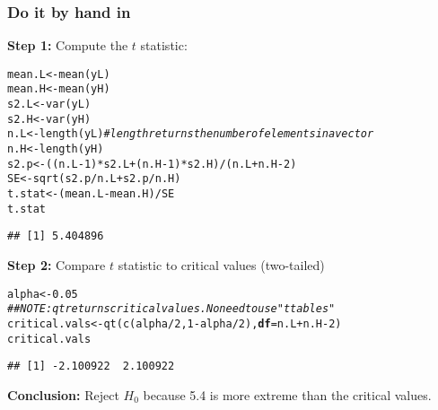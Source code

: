 \documentclass[color=usenames,dvipsnames]{beamer}\usepackage[]{graphicx}\usepackage[]{color}
\makeatletter
\newcommand{\hlnum}[1]{\textcolor[rgb]{0.69,0.494,0}{#1}}%
\newcommand{\hlcom}[1]{\textcolor[rgb]{0.514,0.506,0.514}{\textit{#1}}}%
\newcommand{\hlopt}[1]{\textcolor[rgb]{0,0,0}{#1}}%
\newcommand{\hlstd}[1]{\textcolor[rgb]{0,0,0}{#1}}%
\newcommand{\hlkwb}[1]{\textcolor[rgb]{0,0.341,0.682}{#1}}%
\newcommand{\hlkwc}[1]{\textcolor[rgb]{0,0,0}{\textbf{#1}}}%
\newcommand{\hlkwd}[1]{\textcolor[rgb]{0.004,0.004,0.506}{#1}}%
\newenvironment{kframe}{%
 \def\at@end@of@kframe{}%
 \ifinner\ifhmode%
  \def\at@end@of@kframe{\end{minipage}}%
  \begin{minipage}{\columnwidth}%
 \fi\fi%
 \def\FrameCommand##1{\hskip\@totalleftmargin \hskip-\fboxsep
 \colorbox{shadecolor}{##1}\hskip-\fboxsep
     \hskip-\linewidth \hskip-\@totalleftmargin \hskip\columnwidth}%
 \MakeFramed {\advance\hsize-\width
   \@totalleftmargin\z@ \linewidth\hsize
   \@setminipage}}%
 {\par\unskip\endMakeFramed%
 \at@end@of@kframe}
\newenvironment{knitrout}{}{} %
\makeatother
\begin{document}
\begin{frame}[fragile]
  \frametitle{Do it by hand in \R}
  {\bf Step 1:} Compute the $t$ statistic:
  \footnotesize
\begin{knitrout}\scriptsize
{}\color{fgcolor}\begin{kframe}
\begin{alltt}
\hlstd{mean.L} \hlkwb{<-} \hlkwd{mean}\hlstd{(yL)}
\hlstd{mean.H} \hlkwb{<-} \hlkwd{mean}\hlstd{(yH)}
\hlstd{s2.L} \hlkwb{<-} \hlkwd{var}\hlstd{(yL)}
\hlstd{s2.H} \hlkwb{<-} \hlkwd{var}\hlstd{(yH)}
\hlstd{n.L} \hlkwb{<-} \hlkwd{length}\hlstd{(yL)} \hlcom{# length returns the number of elements in a vector}
\hlstd{n.H} \hlkwb{<-} \hlkwd{length}\hlstd{(yH)}
\hlstd{s2.p} \hlkwb{<-} \hlstd{((n.L}\hlopt{-}\hlnum{1}\hlstd{)}\hlopt{*}\hlstd{s2.L} \hlopt{+} \hlstd{(n.H}\hlopt{-}\hlnum{1}\hlstd{)}\hlopt{*}\hlstd{s2.H)}\hlopt{/}\hlstd{(n.L}\hlopt{+}\hlstd{n.H}\hlopt{-}\hlnum{2}\hlstd{)}
\hlstd{SE} \hlkwb{<-} \hlkwd{sqrt}\hlstd{(s2.p}\hlopt{/}\hlstd{n.L} \hlopt{+} \hlstd{s2.p}\hlopt{/}\hlstd{n.H)}
\hlstd{t.stat} \hlkwb{<-} \hlstd{(mean.L} \hlopt{-} \hlstd{mean.H)} \hlopt{/} \hlstd{SE}
\hlstd{t.stat}
\end{alltt}
\begin{verbatim}
## [1] 5.404896
\end{verbatim}
\end{kframe}
\end{knitrout}
\pause
  {\bf Step 2:} Compare $t$ statistic to critical values (two-tailed)
  \footnotesize
\begin{knitrout}\tiny
{}\color{fgcolor}\begin{kframe}
\begin{alltt}
\hlstd{alpha} \hlkwb{<-} \hlnum{0.05}
\hlcom{## NOTE: qt returns critical values. No need to use "t tables"}
\hlstd{critical.vals} \hlkwb{<-} \hlkwd{qt}\hlstd{(}\hlkwd{c}\hlstd{(alpha}\hlopt{/}\hlnum{2}\hlstd{,} \hlnum{1}\hlopt{-}\hlstd{alpha}\hlopt{/}\hlnum{2}\hlstd{),} \hlkwc{df}\hlstd{=n.L}\hlopt{+}\hlstd{n.H}\hlopt{-}\hlnum{2}\hlstd{)}
\hlstd{critical.vals}
\end{alltt}
\begin{verbatim}
## [1] -2.100922  2.100922
\end{verbatim}
\end{kframe}
\end{knitrout}
\scriptsize
  {\bf Conclusion:} Reject $H_0$ because %
  5.4 is more
  extreme than the critical values.
\end{frame}
\end{document}
